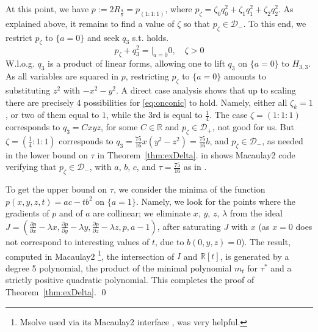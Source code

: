 \documentclass[a4paper,twoside,reqno]{amsart}
\newcommand{\RR}{\mathbb{R}}
\theoremstyle{plain}
\theoremstyle{definition}
\theoremstyle{remark}
\begin{document}
At this point, we have $p:=2R_{\frac{9}{8}}=p_{(1:1:1)}$, where
$p_\zeta=\zeta_0q_0^2+\zeta_1q_1^2+\zeta_2q_2^2$. As explained above, it remains to find
a value of $\zeta$ so that $p_\zeta\in\mathcal{D}_-$.
To this end, we restrict $p_\zeta$ to $\{a=0\}$ and seek $q_3$ s.t.  holds.
\begin{equation}\label{eq:onconic}
  p_\zeta+q_3^2=|_{a=0}0, \quad \zeta>0
\end{equation}
W.l.o.g. $q_3$ is a product of linear forms, allowing one to lift $q_3$ on $\{a=0\}$
to $H_{3,3}$.
As all variables are squared in $p$, restricting $p_\zeta$ to $\{a=0\}$ amounts to
substituting $z^2$ with $-x^2-y^2$.
A direct case analysis shows that up to scaling there are precisely 4 possibilities for
\eqref{eq:onconic} to hold. Namely, either all $\zeta_k=1$, or two of them equal to $1$, while the
3rd is equal to $\frac{1}{4}$. The case $\zeta=(1:1:1)$ corresponds to $q_3=Cxyz$, for some $C\in\RR$ and $p_{\zeta}\in\mathcal{D}_+$, not good for us. But $\zeta=(\frac{1}{4}:1:1)$ corresponds to
$q_3=\frac{75}{16}x(y^2-z^2)=\frac{75}{16}b$, and $p_{\zeta}\in\mathcal{D}_-$, as needed in 
the lower bound on $\tau$ in Theorem~\ref{thm:exDelta}. 
 in  shows Macaulay2 code verifying that $p_\zeta\in\mathcal{D}_-$, with $a$, $b$, $c$, and $\tau=\frac{75}{16}$ as in .


To get the upper bound on $\tau$, we consider the minima of the function
$p(x,y,z,t)=ac-tb^2$ on $\{a=1\}$. Namely, we look for the points where the gradients
of $p$ and of $a$ are collinear; we eliminate $x$, $y$, $z$, $\lambda$ from the ideal 
$J=(\frac{\partial p}{\partial x}-\lambda x, \frac{\partial p}{\partial y}-\lambda y, \frac{\partial p}{\partial z}-\lambda z, p, a-1)$,
after saturating $J$ with $x$ (as $x=0$ does not correspond to interesting values of $t$,
due to $b(0,y,z)=0$). The result, computed in Macaulay2 \cite{M2}\footnote{
Msolve \cite{berthomieu} used via its Macaulay2 interface \cite{MsolveSource}, was very helpful.}, the intersection of $I$ and $\RR[t]$, is generated by 
a degree 5 polynomial, the product of the minimal polynomial $m_t$ for $\tau^*$
and a strictly positive quadratic polynomial. This completes the proof of Theorem~\ref{thm:exDelta}. \qed
\end{document}
